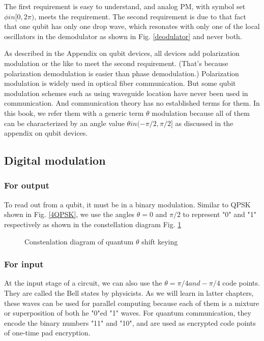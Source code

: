 \documentclass{book}
\begin{document}
The first requirement is easy to understand, and analog PM, with symbol set $\phi in [0, 2\pi)$, meets the requirement. The second requirement is due to that fact that one qubit has only one drop wave, which resonates with only one of the local oscillators in the demodulator as shown in Fig. \ref{deodulator} and never both.

As described in the Appendix on qubit devices, all devices add polarization modulation or the like to meet the second requirement. (That's because polarization demodulation is easier than phase demodulation.) Polarization modulation is widely used in optical fiber communication. But some qubit modulation schemes such as using waveguide location have never been used in communication. And communication theory has no established terms for them. In this book, we refer them with a generic term $\theta$ modulation because all of them can be characterized by an angle value $\theta in (-\pi/2, \pi/2]$ as discussed in the appendix on qubit devices.

\subsection{Digital modulation}
\subsubsection{For output}
To read out from a qubit, it must be in a binary modulation. Similar to QPSK shown in Fig. \ref{4QPSK}, we use the angles $\theta=0$ and $\pi/2$ to represent "0" and "1" respectively as shown in the constellation diagram Fig. \ref{qQPSK} 
\begin{figure}[htbp]
\caption{Constenlation diagram of quantum $\theta$ shift keying}
\label{qQPSK}
\end{figure}

\subsubsection{For input}
At the input stage of a circuit, we can also use the $\theta=\pi/4 and -\pi/4$ code points. They are called the Bell states by physicists. As we will learn in latter chapters, these waves can be used for parallel computing because each of them is a mixture or superposition of both he "0"ed "1" waves. For quantum communication, they encode the binary numbers "11" and "10", and are used as encrypted code points of one-time pad encryption.
\end{document}
